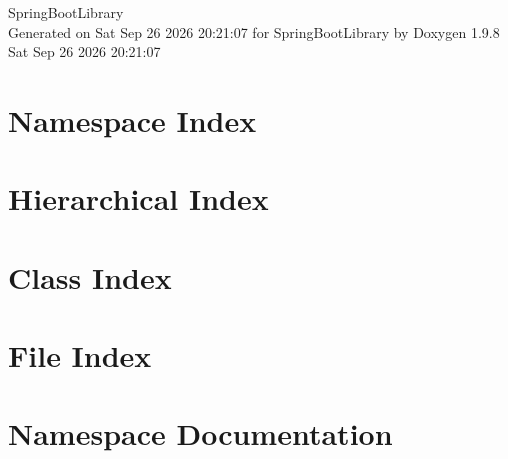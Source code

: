 \documentclass[twoside]{book}
\newcommand{\+}{\discretionary{\mbox{\scriptsize$\hookleftarrow$}}{}{}}
\newcommand{\clearemptydoublepage}{%
    \newpage{\pagestyle{empty}\cleardoublepage}%
  }
\begin{document}
  \raggedbottom
    \hypersetup{pageanchor=false,
                bookmarksnumbered=true,
                pdfencoding=unicode
               }
  \begin{titlepage}
  \vspace*{7cm}
  \begin{center}%
  {\Large Spring\+Boot\+Library}\\
  \vspace*{1cm}
  {\large Generated on Sat Sep 26 2026 20\+:21\+:07 for Spring\+Boot\+Library by Doxygen 1.9.8}\\
    \vspace*{0.5cm}
    {\small Sat Sep 26 2026 20:21:07}
  \end{center}
  \end{titlepage}
  \clearemptydoublepage
  \tableofcontents
  \clearemptydoublepage
  \hypersetup{pageanchor=true}
\chapter{Namespace Index}

\chapter{Hierarchical Index}

\chapter{Class Index}

\chapter{File Index}

\chapter{Namespace Documentation}








\end{document}
